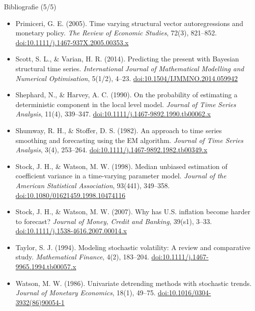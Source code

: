 \begin{frame}{Bibliografie (5/5)}
\itemsize{\tiny}
\begin{itemize}
    \item Primiceri, G. E. (2005). Time varying structural vector autoregressions and monetary policy. \textit{The Review of Economic Studies}, 72(3), 821--852. \href{https://doi.org/10.1111/j.1467-937X.2005.00353.x}{doi:10.1111/j.1467-937X.2005.00353.x}
    \item Scott, S. L., \& Varian, H. R. (2014). Predicting the present with Bayesian structural time series. \textit{International Journal of Mathematical Modelling and Numerical Optimisation}, 5(1/2), 4--23. \href{https://doi.org/10.1504/IJMMNO.2014.059942}{doi:10.1504/IJMMNO.2014.059942}
    \item Shephard, N., \& Harvey, A. C. (1990). On the probability of estimating a deterministic component in the local level model. \textit{Journal of Time Series Analysis}, 11(4), 339--347. \href{https://doi.org/10.1111/j.1467-9892.1990.tb00062.x}{doi:10.1111/j.1467-9892.1990.tb00062.x}
    \item Shumway, R. H., \& Stoffer, D. S. (1982). An approach to time series smoothing and forecasting using the EM algorithm. \textit{Journal of Time Series Analysis}, 3(4), 253--264. \href{https://doi.org/10.1111/j.1467-9892.1982.tb00349.x}{doi:10.1111/j.1467-9892.1982.tb00349.x}
    \item Stock, J. H., \& Watson, M. W. (1998). Median unbiased estimation of coefficient variance in a time-varying parameter model. \textit{Journal of the American Statistical Association}, 93(441), 349--358. \href{https://doi.org/10.1080/01621459.1998.10474116}{doi:10.1080/01621459.1998.10474116}
    \item Stock, J. H., \& Watson, M. W. (2007). Why has U.S. inflation become harder to forecast? \textit{Journal of Money, Credit and Banking}, 39(s1), 3--33. \href{https://doi.org/10.1111/j.1538-4616.2007.00014.x}{doi:10.1111/j.1538-4616.2007.00014.x}
    \item Taylor, S. J. (1994). Modeling stochastic volatility: A review and comparative study. \textit{Mathematical Finance}, 4(2), 183--204. \href{https://doi.org/10.1111/j.1467-9965.1994.tb00057.x}{doi:10.1111/j.1467-9965.1994.tb00057.x}
    \item Watson, M. W. (1986). Univariate detrending methods with stochastic trends. \textit{Journal of Monetary Economics}, 18(1), 49--75. \href{https://doi.org/10.1016/0304-3932(86)90054-1}{doi:10.1016/0304-3932(86)90054-1}
\end{itemize}
\end{frame}


